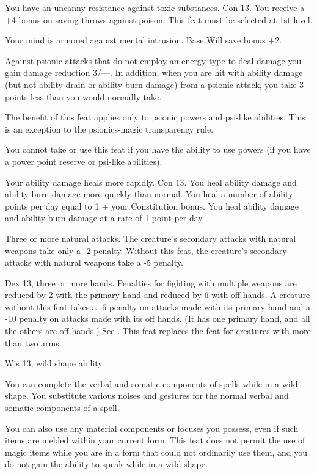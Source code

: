 {You have an uncanny resistance against toxic substances.}
{Con 13.}
{You receive a +4 bonus on saving throws against poison.}{}
{This feat must be selected at 1st level.}

{Your mind is armored against mental intrusion.}
{Base Will save bonus +2.}
{Against psionic attacks that do not employ an energy type to deal damage you gain damage reduction 3/---. In addition, when you are hit with ability damage (but not ability drain or ability burn damage) from a psionic attack, you take 3 points less than you would normally take.

The benefit of this feat applies only to psionic powers and psi-like abilities. This is an exception to the psionics-magic transparency rule.}{}
{You cannot take or use this feat if you have the ability to use powers (if you have a power point reserve or psi-like abilities).}

{Your ability damage heals more rapidly.}
{Con 13.}
{You heal ability damage and ability burn damage more quickly than normal. You heal a number of ability points per day equal to 1 + your Constitution bonus.}
{You heal ability damage and ability burn damage at a rate of 1 point per day.}{}

{}
{Three or more natural attacks.}
{The creature's secondary attacks with natural weapons take only a -2 penalty.}
{Without this feat, the creature's secondary attacks with natural weapons take a -5 penalty.}
{}

{}
{Dex 13, three or more hands.}
{Penalties for fighting with multiple weapons are reduced by 2 with the primary hand and reduced by 6 with off hands.}
{A creature without this feat takes a -6 penalty on attacks made with its primary hand and a -10 penalty on attacks made with its off hands. (It has one primary hand, and all the others are off hands.) See .}
{This feat replaces the  feat for creatures with more than two arms.}

{Wis 13, wild shape ability.}
{You can complete the verbal and somatic components of spells while in a wild shape. You substitute various noises and gestures for the normal verbal and somatic components of a spell.

You can also use any material components or focuses you possess, even if such items are melded within your current form. This feat does not permit the use of magic items while you are in a form that could not ordinarily use them, and you do not gain the ability to speak while in a wild shape.}

